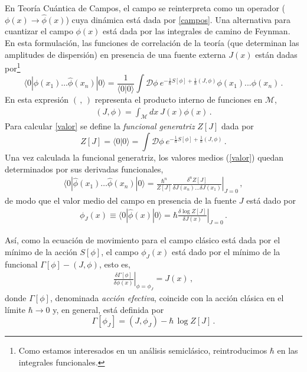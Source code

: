 En Teoría Cuántica de Campos, el campo se reinterpreta como un operador ($\phi(x) \rightarrow \hat{\phi}(x)$) cuya dinámica está dada por \eqref{campos}. Una alternativa para cuantizar el campo $\phi(x)$ está dada por las integrales de camino de Feynman. En esta formulación, las funciones de correlación de la teoría (que determinan las amplitudes de dispersión) en presencia de una fuente externa $J(x)$ están dadas por\footnote{ Como estamos interesados en un análisis semiclásico, reintroducimos $\hbar$ en las integrales funcionales.}
\begin{equation}
\langle 0 | \hat{ \phi  } (x _1) \ldots \hat{\phi  } (x _n) | 0 \rangle = \frac{1}{\langle 0|0\rangle} 
\int  \mathscr D
\phi \ e ^{- \frac{1}{\hbar} S[ \phi ] + \frac{1}{\hbar} (J, \phi )} \phi (x _1) ... \phi (x _n)\,.
\label{valor}
\end{equation}
En esta expresión $(\,,\,) $ representa el producto interno de funciones en $\mathcal{M}$,
\begin{align}
	(J,\phi) = \int_\mathcal{M} dx\ J(x) \phi (x)\,.
\end{align}
Para calcular \eqref{valor} se define la {\it funcional generatriz} $Z[J]$ dada por
\begin{equation}
Z [J] = \langle0|0\rangle=
\int \mathscr D \phi \ e ^{- \frac{1}{ \hbar} S[ \phi ] + \frac{1}{\hbar} (J, \phi )}\,.
\label{eq.generatriz}
\end{equation}
Una vez calculada la funcional generatriz, los valores medios (\ref{valor}) quedan determinados por sus derivadas funcionales,
\begin{equation}
\begin{array}{c}
\langle 0 | \hat{ \phi  } (x _1) \ldots \hat{\phi  } (x _n) | 0 \rangle = \frac{\hbar ^n}{Z[J]}
\left. \frac{\delta ^n  Z[J] }{ \delta J(x_n) \ldots \delta J(x _1) } 		\right| _{J=0}\,,
\end{array}
\end{equation}
de modo que el valor medio del campo en presencia de la fuente $J$ está dado por
\begin{equation}
\begin{array}{c}
\phi _J (x) \equiv \langle 0| \hat{\phi } (x)| 0 \rangle = \hbar \left. \frac{\delta \log Z[J] }{\delta J(x)} \right| _{J=0} \,.
\end{array}
\end{equation}

Así, como la ecuación de movimiento para el campo clásico está dada por el mínimo de la acción $S[\phi]$, el campo $ \phi _J (x) $ está dado por el mínimo de la funcional $\Gamma[\phi]-(J,\phi)$, esto es,
\begin{equation}
\begin{array}{c}
\left.\frac{\delta \Gamma [ \phi ]  }{\delta \phi (x)  }\right|_{\phi=\phi_J} = 
J (x)\,,
\end{array}
\label{eq.accion1}
\end{equation}
donde $\Gamma[\phi]$, denominada {\it acción efectiva}, coincide con la acción clásica en el límite $\hbar\to 0$ y, en general, está definida por
\begin{equation}
\Gamma [\phi _J] = (J, \phi _J) -  \hbar \, \log Z [J]\,.
\label{efectiva}
\end{equation}


